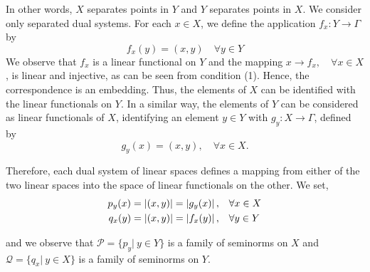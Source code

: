 In other words, $X$ separates points in $Y$ and $Y$ separates points in $X$.
We consider only separated dual systems.
For each $x \in X$, we define the application $f_x: Y \rightarrow \Gamma$ by
\[f_x(y) = (x, y) \quad \forall y \in Y\]
We observe that $f_x$ is a linear functional on $Y$ and the mapping
$x \rightarrow f_x, \quad \forall x \in X$,
is linear and injective, as can be seen from condition (1). Hence, the correspondence is an embedding. Thus, the elements of $X$ can be identified with the linear
functionals on $Y$. In a similar way, the elements of $Y$ can be considered as linear functionals of $X$, identifying an element $y \in Y$ with $g_y: X\rightarrow \Gamma$, defined by
\[g_y(x) = (x, y), \quad \forall x \in X.\]

Therefore, each dual system of linear spaces defines a mapping from either of the two linear spaces into the space of linear functionals on the other.
We set,
\begin{align*}
p_y(x)=\left|(x,y)\right|=\left|g_y(x)\right|, & \quad \forall x \in X \\	
q_x(y)=\left|(x,y)\right|=\left|f_x(y)\right|, & \quad \forall y \in Y
\end{align*}

and we observe that $\mathcal{P} = \{p_y | \ y \in Y \}$ is a family of seminorms on $X$ and $\mathcal{Q}=
\{q_x | \ y \in  X\} $ is a family of seminorms on $Y$. 




